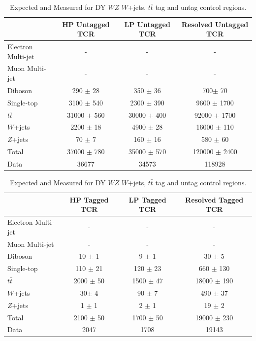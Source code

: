\begin{table}
\begin{tabular}{|l|c|c|c|}
\hline
	  &	 HP Untagged TCR &	 LP Untagged TCR &	Resolved Untagged TCR \\\hline 
	Electron Multi-jet &	- &	- &	- \\\hline 
	Muon Multi-jet &	- &	- &	- \\\hline 
	Diboson &	290 $\pm$ 28 &	350 $\pm$ 36 &	700$\pm$ 70 \\\hline 
	Single-top &	3100 $\pm$ 540 &	2300 $\pm$ 390 &	9600 $\pm$ 1700\\\hline 
	$t\bar{t}$ &	31000 $\pm$ 560 &	30000 $\pm$ 400 &	92000 $\pm$ 1700 \\\hline 
	$W$+jets &	2200 $\pm$ 18 &	4900 $\pm$ 28 &	16000 $\pm$ 110 \\\hline 
	$Z$+jets &	70 $\pm$ 7 &	160 $\pm$ 16 &	580 $\pm$ 60 \\\hline 
	Total &	37000 $\pm$ 780&	35000 $\pm$ 570&	120000 $\pm$ 2400 \\\hline 
	Data &	36677 &	34573 &	118928 \\\hline 
\end{tabular}

\begin{tabular}{|l|c|c|c|}
\hline
	  &	 HP Tagged TCR &	 LP Tagged TCR &	Resolved Tagged TCR \\\hline 
	Electron Multi-jet &	- &	- &	- \\\hline 
	Muon Multi-jet &	- &	- &	- \\\hline 
	Diboson &	10 $\pm$ 1 &	9 $\pm$ 1 &	30 $\pm$ 5\\\hline 
	Single-top &	110 $\pm$ 21 &	120 $\pm$ 23 &	660 $\pm$ 130 \\\hline 
	$t\bar{t}$ &	2000 $\pm$ 50 &	1500 $\pm$ 47 &	18000 $\pm$ 190 \\\hline 
	$W$+jets &	30$\pm$ 4 &	90 $\pm$ 7 &	490 $\pm$ 37 \\\hline 
	$Z$+jets &	1 $\pm$ 1 &	2 $\pm$ 1 &	19 $\pm$ 2 \\\hline 
	Total &	2100 $\pm$ 50 &	1700 $\pm$ 50 &	19000 $\pm$ 230 \\\hline 
	Data &	2047 &	1708 &	19143 \\\hline 
\end{tabular}


\caption{Expected and Measured for DY $WZ$ $W$+jets, $t\bar{t}$ tag and untag control regions.}
\label{tbl:hvtwz_yields_cr}
\end{table}

